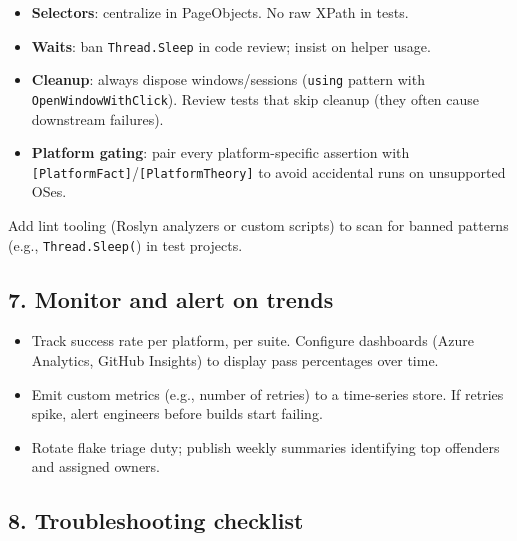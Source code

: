 \begin{itemize}
\tightlist
\item
  \textbf{Selectors}: centralize in PageObjects. No raw XPath in tests.
\item
  \textbf{Waits}: ban \passthrough{\lstinline!Thread.Sleep!} in code
  review; insist on helper usage.
\item
  \textbf{Cleanup}: always dispose windows/sessions
  (\passthrough{\lstinline!using!} pattern with
  \passthrough{\lstinline!OpenWindowWithClick!}). Review tests that skip
  cleanup (they often cause downstream failures).
\item
  \textbf{Platform gating}: pair every platform-specific assertion with
  \passthrough{\lstinline![PlatformFact]!}/\passthrough{\lstinline![PlatformTheory]!}
  to avoid accidental runs on unsupported OSes.
\end{itemize}

Add lint tooling (Roslyn analyzers or custom scripts) to scan for banned
patterns (e.g., \passthrough{\lstinline!Thread.Sleep(!}) in test
projects.

\subsection{7. Monitor and alert on
trends}\label{monitor-and-alert-on-trends}

\begin{itemize}
\tightlist
\item
  Track success rate per platform, per suite. Configure dashboards
  (Azure Analytics, GitHub Insights) to display pass percentages over
  time.
\item
  Emit custom metrics (e.g., number of retries) to a time-series store.
  If retries spike, alert engineers before builds start failing.
\item
  Rotate flake triage duty; publish weekly summaries identifying top
  offenders and assigned owners.
\end{itemize}

\subsection{8. Troubleshooting
checklist}\label{troubleshooting-checklist-2}

